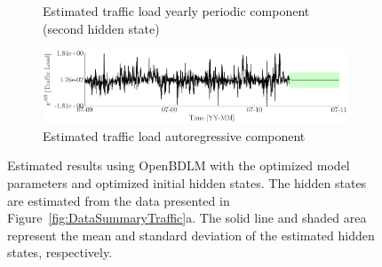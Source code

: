 \begin{figure}[h!]
\begin{center}
\begin{subfigure}{\linewidth}
\caption{Estimated traffic load yearly periodic component (second hidden state)}
\end{subfigure}
\begin{subfigure}{\linewidth}\centering
\includegraphics[width=0.9\linewidth]{./docfigs/Example_TRAFFIC/optim_param_optim_initialhiddenstate/TrafficLoad_AR_4.pdf} 
\caption{Estimated traffic load autoregressive component}
\end{subfigure}
\caption{Estimated results using OpenBDLM with the optimized model parameters and optimized initial hidden states. The hidden states are estimated from the data presented in Figure~\ref{fig:DataSummaryTraffic}a. The solid line and shaded area represent the mean and standard deviation of the estimated hidden states, respectively.}
\label{fig:Example_TrafficOptimizedOptimized}
\end{center}
\end{figure}

